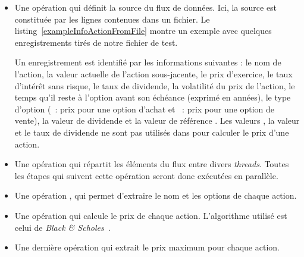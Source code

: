 \begin{itemize}

\item Une op\'eration qui d\'efinit la source du flux de donn\'ees. Ici, la source est constitu\'ee par les lignes contenues dans un fichier. Le listing~\ref{exampleInfoActionFromFile} montre un exemple avec quelques enregistrements tir\'es de notre fichier de test. 

Un enregistrement est identifi\'e par les informations suivantes : le nom de l'action, la valeur actuelle de l'action sous-jacente, le prix d'exercice, le taux d'int\'er\^et sans risque, le taux de dividende, la volatilit\'e du prix de l'action, le temps qu'il reste \`a l'option avant son \'ech\'eance (exprim\'e en ann\'ees), le type d'option (~: prix pour une option d'achat et ~: prix pour une option de vente), la valeur de dividende et la valeur de r\'ef\'erence . 
Les valeurs , la valeur et le taux de dividende ne sont pas utilis\'es dans  pour calculer le prix d'une action.

\item Une op\'eration qui r\'epartit les \'el\'ements du flux entre divers \emph{threads}.
Toutes les \'etapes qui suivent cette op\'eration seront donc ex\'ecut\'ees en parall\`ele.

\item Une op\'eration  , qui permet d'extraire le nom et les options de chaque action.



\item  Une op\'eration qui calcule le prix de chaque action. L'algorithme utilis\'e est celui de \emph{Black \& Scholes}~\citep{macbeth1979empirical}. 

\item Une derni\`ere op\'eration qui extrait le prix maximum pour chaque action.


\end{itemize}

